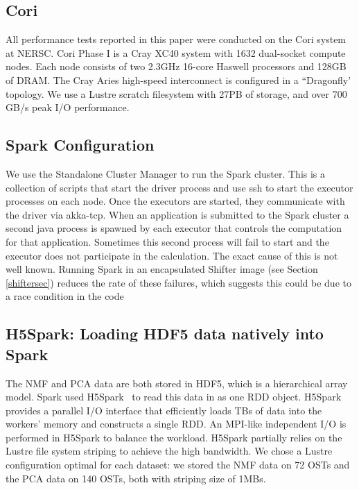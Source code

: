 \subsection{Cori}
All performance tests reported in this paper were conducted on the Cori system at NERSC. Cori Phase I is a Cray XC40 system with 1632 dual-socket compute nodes. Each node consists of two 2.3GHz 16-core Haswell processors and 128GB of DRAM. The Cray Aries high-speed interconnect is configured in a ``Dragonfly' topology. We use a Lustre scratch filesystem with 27PB of storage, and over 700 GB/s peak I/O performance. 

\subsection{Spark Configuration}
We use the Standalone Cluster Manager to run the Spark cluster. This is a collection of scripts that start the driver process and use ssh to start the executor processes on each node. Once the executors are started, they communicate with the driver via akka-tcp. When an application is submitted to the Spark cluster a second java process is spawned by each executor that controls the computation for that application. Sometimes this second process will fail to start and the executor does not participate in the calculation. The exact cause of this is not well known. Running Spark in an encapsulated Shifter image (see Section \ref{shiftersec}) reduces the rate of these failures, which suggests this could be due to a race condition in the code

\subsection{H5Spark: Loading HDF5 data natively into Spark}
The NMF and PCA data are both stored in HDF5, which is a hierarchical array model. Spark used H5Spark~\cite{h5spark-cug16} to read this data in as one RDD object. H5Spark provides a parallel I/O interface that efficiently loads TBs of data into the workers' memory and constructs a single RDD. An MPI-like independent I/O is performed in H5Spark to balance the workload. H5Spark partially relies on the Lustre file system striping to achieve the high bandwidth. We chose a Lustre configuration optimal for each dataset: we stored the NMF data on 72 OSTs and the PCA data on 140 OSTs, both with striping size of 1MBs. 

